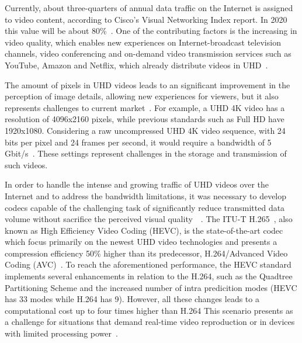 \documentclass[journal]{IEEEtran}
\begin{document}
Currently, about three-quarters of annual data traffic on the Internet is assigned to video content, according to Cisco's Visual Networking Index report. 
In 2020 this value will be about 80\%~\cite{Cisco:16}. One of the contributing factors is the increasing in video quality, which enables new experiences on Internet-broadcast television channels, video conferencing and on-demand video transmission services such as YouTube, Amazon and Netflix, which already distribute videos in UHD~\cite{cheon:14}.


The amount of pixels in UHD videos leads to an significant improvement in the perception of image details, allowing new experiences for viewers, but it also represents challenges to current market~\cite{cheon:14}. For example, a UHD 4K video has a resolution of 4096x2160 pixels, while previous standards such as Full HD have 1920x1080. Considering a raw uncompressed UHD 4K video sequence, with 24 bits per pixel and 24 frames per second, it would require a bandwidth of 5 Gbit/s~\cite{gomes:13}. These settings represent challenges in the storage and transmission of such videos.

In order to handle the intense and growing traffic of UHD videos over the Internet and to address the bandwidth limitations, it was necessary to develop codecs capable of the challenging task of significantly reduce transmitted data volume without sacrifice the perceived visual quality~\cite{oliveira:16}\cite{wang:13}~\cite{netflix:16}. The ITU-T H.265~\cite{itu:265}, also known as High Efficiency Video Coding (HEVC), is the state-of-the-art codec which focus primarily on the newest UHD video technologies and presents a compression efficiency 50\% higher than its predecessor, H.264/Advanced Video Coding (AVC)~\cite{Bossen:12}\cite{Hanhart:12}\cite{Sullivan:12}. To reach the aforementioned performance, the HEVC standard implements several enhancements in relation to the H.264, such as the Quadtree Partitioning Scheme%
and the increased number of intra predicition modes (HEVC has 33 modes while H.264 has 9). However, all these changes leads to a computational cost up to four times higher than H.264%
This scenario presents as a challenge for situations that demand real-time video reproduction or in devices with limited processing power~\cite{Yoon:13}\cite{Correa:12}.
\end{document}

